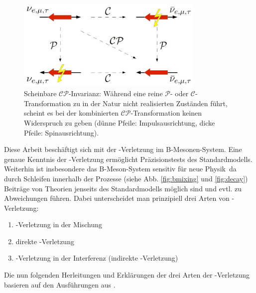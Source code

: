 \begin{figure}[hptb]
\centering
\includegraphics[width = 0.8\textwidth]{cp_invarianz}
\caption{Scheinbare $\mathcal{CP}$-Invarianz: Während eine reine $\mathcal{P}$- oder $\mathcal{C}$-Transformation zu in der Natur nicht realisierten Zuständen führt, scheint es bei der kombinierten $\mathcal{CP}$-Transformation keinen Widerspruch zu geben (dünne Pfeile: Impulsausrichtung, dicke Pfeile: Spinausrichtung).}
\label{fig:cp_invarianz}
\end{figure}

Diese Arbeit beschäftigt sich mit der \CP-Verletzung im B-Mesonen-System. Eine genaue Kenntnis der \CP-Verletzung ermöglicht Präzisionstests des Standardmodells. Weiterhin ist insbesondere das B-Meson-System sensitiv für \glqq neue Physik\grqq\, da durch Schleifen innerhalb der Prozesse (siehe Abb. \ref{fig:bmixing} und \ref{fig:decay}) Beiträge von Theorien jenseits des Standardmodells möglich sind und evtl. zu Abweichungen führen. Dabei unterscheidet man prinzipiell drei Arten von \CP-Verletzung:
\begin{enumerate}
\item \CP-Verletzung in der Mischung
\item direkte \CP-Verletzung
\item \CP-Verletzung in der Interferenz (indirekte \CP-Verletzung)
\end{enumerate}
Die nun folgenden Herleitungen und Erklärungen der drei Arten der \CP-Verletzung basieren auf den Ausführungen aus \cite{kleinknecht}.

